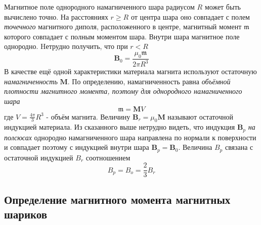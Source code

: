 \documentclass[a4paper, 12pt]{article}
\begin{document}
Магнитное поле однородного намагниченного шара радиусом $R$ может быть вычислено точно. На расстояниях $r \geq R$ от центра шара оно совпадает с полем \textit{точечного} магнитного диполя, расположенного в центре, магнитный момент $\mathfrak{m}$ которого совпадает с полным моментом шара. Внутри шара магнитное поле однородно. Hетрудно получить, что при $r < R$
\begin{equation}
	\textbf{B}_{0} = \frac{\mu_0 \mathfrak{m}}{2\pi R^3}
\end{equation}
В качестве ещё одной характеристики материала магнита используют остаточную \textit{намагниченность} $\textbf{M}$. По определению, намагниченность равна \textit{объёмной плотности магнитного момента, поэтому для однородного намагниченного шара}
\begin{equation}
	\mathfrak{m}= \textbf{M}V
\end{equation}
где $\displaystyle V = \frac{4\pi}{3}R^3$ - объём магнита. Величину $\textbf{B}_r = \mu_0 \textbf{M}$ называют остаточной индукцией материала.
Из сказанного выше нетрудно видеть, что индукция $\textbf{B}_p$ \textit{на полсюсах} однородно намагниченного шара направлена по нормали к поверхности и совпадает поэтому с индукцией внутри шара $\textbf{B}_p = \textbf{B}_0$. Величина $B_p$ связана с остаточной индукцией $B_r$ соотношением
\begin{equation}
	B_p = B_o = \frac{2}{3}B_r
\end{equation}

\subsection{Определение магнитного момента магнитных шариков}
\end{document}
